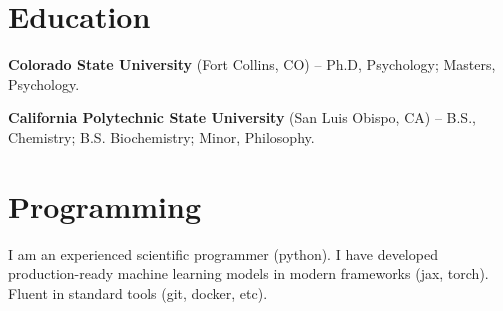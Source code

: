 \documentclass[margin,line]{res}
\newenvironment{list1}{
    \begin{list}{\ding{113}}{%
        \setlength{\itemsep}{0in}
        \setlength{\parsep}{0in} \setlength{\parskip}{0in}
        \setlength{\topsep}{0in} \setlength{\partopsep}{0in}
        \setlength{\leftmargin}{0.17in}}}{
    \end{list}}
\begin{document}
\begin{resume}
\vspace{-.2cm}
\section{\sc Education}
{\bf Colorado State University} (Fort Collins, CO) --  Ph.D, Psychology; Masters, Psychology.\\
\vspace*{-.15in}

\vspace*{-.15in}
{\bf California Polytechnic State University} (San Luis Obispo, CA) -- B.S., Chemistry; B.S. Biochemistry; Minor, Philosophy.\\


\vspace{-.6cm}
\section{\sc Programming} I am an experienced scientific programmer (python). I have developed production-ready machine learning models in modern frameworks (jax, torch). Fluent in standard tools (git, docker, etc).





\end{resume}
\end{document}
